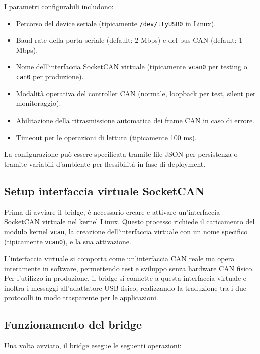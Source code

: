 I parametri configurabili includono:
\begin{itemize}
    \item Percorso del device seriale (tipicamente \texttt{/dev/ttyUSB0} in Linux).
    \item Baud rate della porta seriale (default: 2 Mbps) e del bus CAN (default: 1 Mbps).
    \item Nome dell'interfaccia SocketCAN virtuale (tipicamente \texttt{vcan0} per testing o \texttt{can0} per produzione).
    \item Modalità operativa del controller CAN (normale, loopback per test, silent per monitoraggio).
    \item Abilitazione della ritrasmissione automatica dei frame CAN in caso di errore.
    \item Timeout per le operazioni di lettura (tipicamente 100 ms).
\end{itemize}

La configurazione può essere specificata tramite file JSON per persistenza o tramite variabili d'ambiente per flessibilità in fase di deployment.

\subsection{Setup interfaccia virtuale SocketCAN}

Prima di avviare il bridge, è necessario creare e attivare un'interfaccia SocketCAN virtuale nel kernel Linux. Questo processo richiede il caricamento del modulo kernel \texttt{vcan}, la creazione dell'interfaccia virtuale con un nome specifico (tipicamente \texttt{vcan0}), e la sua attivazione.

L'interfaccia virtuale si comporta come un'interfaccia CAN reale ma opera interamente in software, permettendo test e sviluppo senza hardware CAN fisico. Per l'utilizzo in produzione, il bridge si connette a questa interfaccia virtuale e inoltra i messaggi all'adattatore USB fisico, realizzando la traduzione tra i due protocolli in modo trasparente per le applicazioni.

\subsection{Funzionamento del bridge}

Una volta avviato, il bridge esegue le seguenti operazioni:

